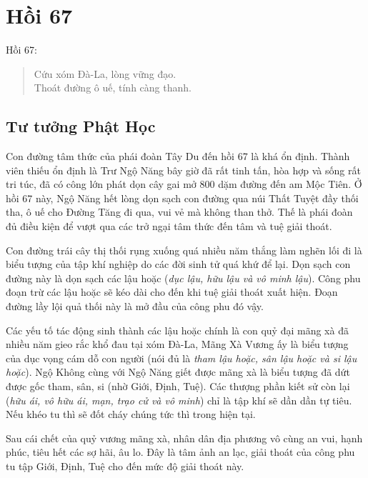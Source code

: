 \chapter{Hồi 67} %
\label{cha:hoi_67}

Hồi 67:

\begin{verse}
\begin{itshape}
Cứu xóm Đà-La, lòng vững đạo.\\
Thoát đường ô uế, tính càng thanh.
\end{itshape}
\end{verse}

\section{Tư tưởng Phật Học} %
\label{sec:67_phat_hoc}

Con đường tâm thức của phái đoàn Tây Du đến hồi 67 là khá ổn định. Thành viên thiếu ổn định là Trư Ngộ Năng bây giờ đã rất tinh tấn, hòa hợp và sống rất tri túc, đã có công lớn phát dọn cây gai mở 800 dặm đường đến am Mộc Tiên. Ở hồi 67 này, Ngộ Năng hết lòng dọn sạch con đường qua núi Thất Tuyệt đầy thối tha, ô uế cho Đường Tăng đi qua, vui vẻ mà không than thở. Thế là phái đoàn đủ điều kiện để vượt qua các trở ngại tâm thức đến tâm và tuệ giải thoát.

Con đường trái cây thị thối rụng xuống quá nhiều năm thắng làm nghẽn lối đi là biểu tượng của tập khí nghiệp do các đời sinh tử quá khứ để lại. Dọn sạch con đường này là dọn sạch các lậu hoặc (\emph{dục lậu, hữu lậu và vô minh lậu}). Công phu đoạn trừ các lậu hoặc sẽ kéo dài cho đến khi tuệ giải thoát xuất hiện. Đoạn đường lầy lội quả thối này là mở đầu của công phu đó vậy.

Các yếu tố tác động sinh thành các lậu hoặc chính là con quỷ đại mãng xà đã nhiều năm gieo rắc khổ đau tại xóm Đà-La, Mãng Xà Vương ấy là biểu tượng của dục vọng cám dỗ con người (nói đủ là \emph{tham lậu hoặc, sân lậu hoặc và si lậu hoặc}). Ngộ Không cùng với Ngộ Năng giết được mãng xà là biểu tượng đã dứt được gốc tham, sân, si (nhờ Giới, Định, Tuệ). Các thượng phần kiết sử còn lại (\emph{hữu ái, vô hữu ái, mạn, trạo cử và vô minh}) chỉ là tập khí sẽ dần dần tự tiêu. Nếu khéo tu thì sẽ đốt cháy chúng tức thì trong hiện tại.

Sau cái chết của quỷ vương mãng xà, nhân dân địa phương vô cùng an vui, hạnh phúc, tiêu hết các sợ hãi, âu lo. Đây là tâm ảnh an lạc, giải thoát của công phu tu tập Giới, Định, Tuệ cho đến mức độ giải thoát này.

